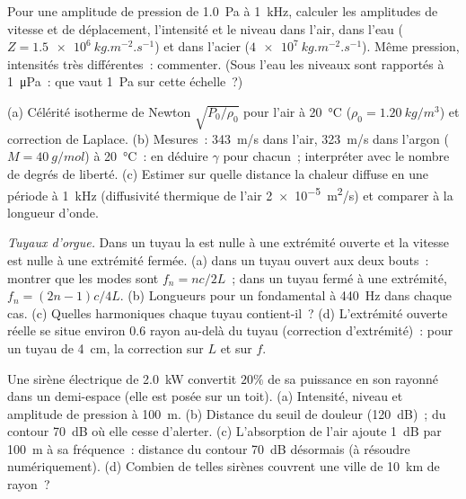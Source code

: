 \begin{exercise}[$\star\star$]\label{exo:b2:sound-waves:6}
Pour une amplitude de pression de \qty{1.0}{Pa} à \qty{1}{kHz}, calculer les
amplitudes de vitesse et de déplacement, l'intensité et le niveau dans
l'air, dans l'eau ($Z = \qty{1.5e6}{kg.m^{-2}.s^{-1}}$) et dans l'acier
($\qty{4e7}{kg.m^{-2}.s^{-1}}$). Même pression, intensités très différentes~:
commenter. (Sous l'eau les niveaux sont rapportés à \qty{1}{\micro Pa}~: que vaut
\qty{1}{Pa} sur cette échelle~?)
\end{exercise}

\begin{exercise}[$\star\star$]\label{exo:b2:sound-waves:7}
(a) Célérité isotherme de Newton $\sqrt{P_0/\rho_0}$ pour l'air à
\qty{20}{\degreeCelsius} ($\rho_0 = \qty{1.20}{kg/m^3}$) et correction de Laplace.
(b) Mesures~: \qty{343}{m/s} dans l'air, \qty{323}{m/s} dans l'argon ($M = \qty{40}{g/mol}$)
à \qty{20}{\degreeCelsius}~: en déduire $\gamma$ pour chacun~; interpréter avec le
nombre de degrés de liberté. (c) Estimer sur quelle distance la chaleur diffuse en
une période à \qty{1}{kHz} (diffusivité thermique de l'air
\qty{2e-5}{m^2/s}) et comparer à la longueur d'onde.
\end{exercise}

\begin{exercise}[$\star\star$]\label{exo:b2:sound-waves:8}
\emph{Tuyaux d'orgue.} Dans un tuyau la  est nulle à une extrémité ouverte
et la vitesse est nulle à une extrémité fermée. (a)  dans un tuyau
ouvert aux deux bouts~: montrer que les modes sont $f_n = nc/2L$~; dans un tuyau fermé à
une extrémité, $f_n = (2n - 1)c/4L$. (b) Longueurs pour un fondamental à \qty{440}{Hz}
dans chaque cas. (c) Quelles harmoniques chaque tuyau contient-il~? (d) L'extrémité
ouverte réelle se situe environ $0.6$ rayon au-delà du tuyau (correction d'extrémité)~: pour
un tuyau de \qty{4}{cm}, la correction sur $L$ et sur $f$.
\end{exercise}

\begin{exercise}[$\star\star$]\label{exo:b2:sound-waves:9}
Une sirène électrique de \qty{2.0}{kW} convertit $20\%$ de sa puissance en son
rayonné dans un demi-espace (elle est posée sur un toit). (a) Intensité, niveau
et amplitude de pression à \qty{100}{m}. (b) Distance du seuil de douleur
(\qty{120}{dB})~; du contour \qty{70}{dB} où elle cesse d'alerter.
(c) L'absorption de l'air ajoute \qty{1}{dB} par \qty{100}{m} à sa fréquence~:
distance du contour \qty{70}{dB} désormais (à résoudre numériquement). (d) Combien
de telles sirènes couvrent une ville de \qty{10}{km} de rayon~?
\end{exercise}

